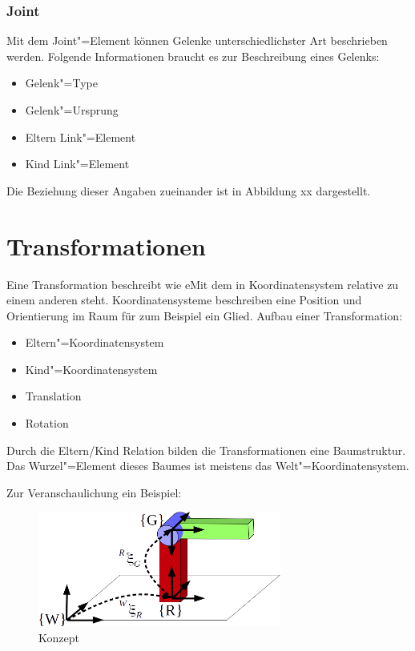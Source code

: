 \subsubsection*{Joint}
Mit dem Joint"=Element können Gelenke unterschiedlichster Art beschrieben werden.
Folgende Informationen braucht es zur Beschreibung eines Gelenks:
\begin{itemize}
\item Gelenk"=Type
\item Gelenk"=Ursprung
\item Eltern Link"=Element
\item Kind Link"=Element
\end{itemize}
Die Beziehung dieser Angaben  zueinander ist in Abbildung xx dargestellt.


\section{Transformationen} %
Eine Transformation beschreibt wie eMit dem in Koordinatensystem relative zu einem anderen steht.
Koordinatensysteme beschreiben eine Position und Orientierung im Raum für zum Beispiel ein Glied.
Aufbau einer Transformation:
\begin{itemize}
\item Eltern"=Koordinatensystem
\item Kind"=Koordinatensystem
\item Translation
\item Rotation
\end{itemize}

Durch die Eltern/Kind Relation bilden die Transformationen eine Baumstruktur.
Das Wurzel"=Element dieses Baumes ist meistens das Welt"=Koordinatensystem.


Zur Veranschaulichung ein Beispiel:
\begin{figure}[ht!]
	\centering
	\includegraphics[width=8cm]{images/Transformation.png}
	\caption{Konzept}
	\label{Ab:konzept}
\end{figure}

